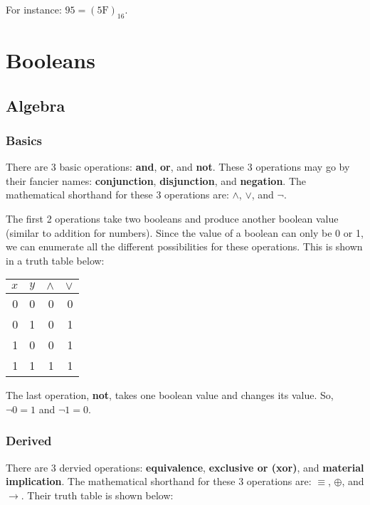\documentclass[12pt]{book}
\begin{document}
  For instance: $95 = (5\text{F})_{16}$.

  \chapter{Booleans}

  \section{Algebra}

  \subsection{Basics}

  There are 3 basic operations: \textbf{and}, \textbf{or}, and \textbf{not}.
  These 3 operations may go by their fancier names: \textbf{conjunction},
  \textbf{disjunction}, and \textbf{negation}. The mathematical shorthand for
  these 3 operations are: $\land$, $\lor$, and $\lnot$.

  The first 2 operations take two booleans and produce another boolean value
  (similar to addition for numbers). Since the value of a boolean can only be
  0 or 1, we can enumerate all the different possibilities for these operations.
  This is shown in a truth table below:

  \begin{center}
    \begin{tabular}{r r | r | r}
      $x$ & $y$ & $\land$ & $\lor$ \\
      \hline
        0 &   0 &       0 &      0 \\
        0 &   1 &       0 &      1 \\
        1 &   0 &       0 &      1 \\
        1 &   1 &       1 &      1 \\
    \end{tabular}
  \end{center}

  The last operation, \textbf{not}, takes one boolean value and changes its
  value. So, $\lnot 0 = 1$ and $\lnot 1 = 0$.

  \subsection{Derived}

  There are 3 dervied operations: \textbf{equivalence}, \textbf{exclusive or
  (xor)}, and \textbf{material implication}. The mathematical shorthand for
  these 3 operations are: $\equiv$, $\oplus$, and $\to$. Their truth table is
  shown below:
\end{document}
